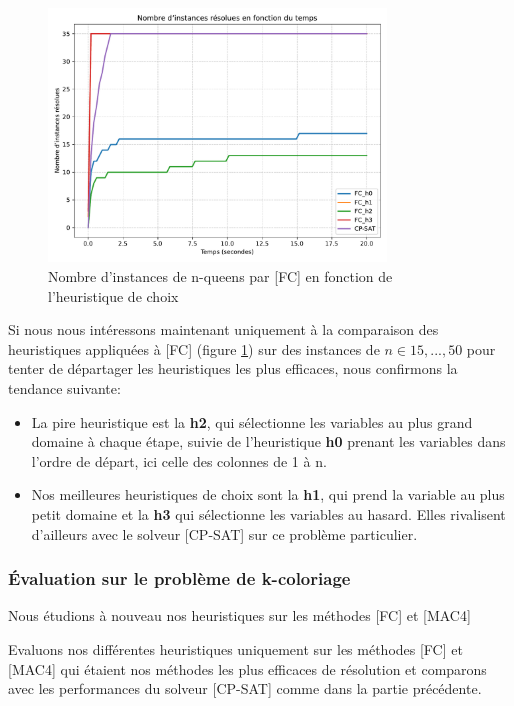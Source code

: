\documentclass[14pt]{article}
\begin{document}
\begin{figure}[H]
    \centering
    \includegraphics[width=0.8\textwidth]{Images/n-queens-h-FC.pdf}
    \caption{Nombre d'instances de n-queens par [FC] en fonction de l'heuristique de choix}
    \label{fig:n-queens-h2}
\end{figure}

Si nous nous intéressons maintenant uniquement à la comparaison des heuristiques appliquées à [FC] (figure \ref{fig:n-queens-h2}) sur des instances de $n \in 15,...,50$ pour tenter de départager les heuristiques les plus efficaces, nous confirmons la tendance suivante:

\begin{itemize}
    \item La pire heuristique est la \textbf{h2}, qui sélectionne les variables au plus grand domaine à chaque étape, suivie de l'heuristique \textbf{h0} prenant les variables dans l'ordre de départ, ici celle des colonnes de 1 à n.
    \item Nos meilleures heuristiques de choix sont la \textbf{h1}, qui prend la variable au plus petit domaine et la \textbf{h3} qui sélectionne les variables au hasard. Elles rivalisent d'ailleurs avec le solveur [CP-SAT] sur ce problème particulier.
\end{itemize}


\subsubsection{Évaluation sur le problème de k-coloriage}

Nous étudions à nouveau nos heuristiques sur les méthodes [FC] et [MAC4]

Evaluons nos différentes heuristiques uniquement sur les méthodes [FC] et [MAC4] qui étaient nos méthodes les plus efficaces de résolution et comparons avec les performances du solveur [CP-SAT] comme dans la partie précédente.

\end{document}
